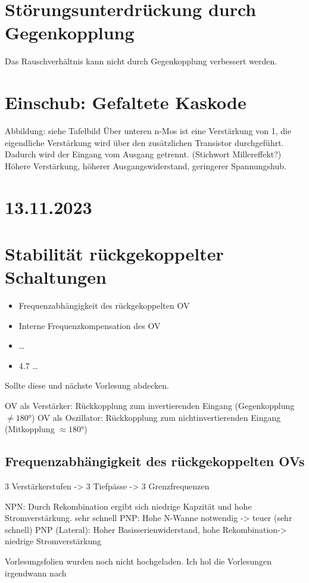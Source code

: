 \documentclass[a4paper]{article}
\begin{document}
\section*{Störungsunterdrückung durch Gegenkopplung}
Das Rauschverhältnis kann nicht durch Gegenkopplung verbessert werden.

\section*{Einschub: Gefaltete Kaskode}
Abbildung: siehe Tafelbild
Über unteren n-Mos ist eine Verstärkung von 1, die eigendliche Verstärkung wird
über den zusätzlichen Transistor durchgeführt. Dadurch wird der Eingang vom Ausgang getrennt. (Stichwort Millereffekt?)
Höhere Verstärkung, höherer Ausgangswiderstand, geringerer Spannungshub.

\section*{13.11.2023}
\section*{Stabilität rückgekoppelter Schaltungen}
\begin{itemize}
    \item Frequenzabhängigkeit des rückgekoppelten OV
    \item Interne Frequenzkompensation des OV
    \item \ldots
    \item 4.7 \ldots
\end{itemize}
Sollte diese und nächste Vorlesung abdecken.

OV als Verstärker: Rückkopplung zum invertierenden Eingang (Gegenkopplung $\neq 180°$)
OV als Oszillator: Rückkopplung zum nichtinvertierenden Eingang (Mitkopplung $\approx 180°$)

\subsection*{Frequenzabhängigkeit des rückgekoppelten OVs}
3 Verstärkerstufen -> 3 Tiefpässe -> 3 Grenzfrequenzen

NPN: Durch Rekombination ergibt sich niedrige Kapzität und hohe Stromverstärkung. sehr schnell
PNP: Hohe N-Wanne notwendig -> teuer (sehr schnell)
PNP (Lateral): Hoher Basisserienwiderstand, hohe Rekombination-> niedrige Stromverstärkung

Vorlesungsfolien wurden noch nicht hochgeladen. Ich hol die Vorlesungen irgendwann nach 
\end{document}
